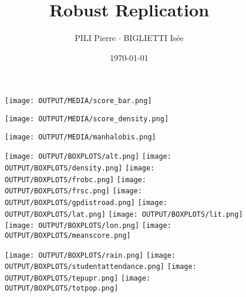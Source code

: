 \documentclass[12pt]{article}
\title{Robust Replication}
\author{PILI Pierre $\cdot$ BIGLIETTI Isée}
\date{\today}
\begin{document}
\maketitle


\begin{figure}[p]  %
    \centering
    \texttt{[image: OUTPUT/MEDIA/score\_bar.png]}  %
    \label{fig:bar}
\end{figure}
\begin{figure}[p]  %
    \centering
    \texttt{[image: OUTPUT/MEDIA/score\_density.png]}  %
    \label{fig:density}
\end{figure}
\begin{figure}[p]  %
  \centering
  \texttt{[image: OUTPUT/MEDIA/manhalobis.png]}  %
  \label{fig:manhalobis}
\end{figure}

\begin{figure}[p]
  \centering
  \texttt{[image: OUTPUT/BOXPLOTS/alt.png]}
  \texttt{[image: OUTPUT/BOXPLOTS/density.png]}
  \texttt{[image: OUTPUT/BOXPLOTS/frobc.png]}
  \texttt{[image: OUTPUT/BOXPLOTS/frsc.png]}
  \texttt{[image: OUTPUT/BOXPLOTS/gpdistroad.png]}
  \texttt{[image: OUTPUT/BOXPLOTS/lat.png]}
  \texttt{[image: OUTPUT/BOXPLOTS/lit.png]}
  \texttt{[image: OUTPUT/BOXPLOTS/lon.png]}
  \texttt{[image: OUTPUT/BOXPLOTS/meanscore.png]}
  \label{fig:boxplots1}
\end{figure}
\begin{figure}[p]
  \centering
  \texttt{[image: OUTPUT/BOXPLOTS/rain.png]}
  \texttt{[image: OUTPUT/BOXPLOTS/studentattendance.png]}
  \texttt{[image: OUTPUT/BOXPLOTS/tepupr.png]}
  \texttt{[image: OUTPUT/BOXPLOTS/totpop.png]}

  \label{fig:boxplots2}
\end{figure}
\end{document}
